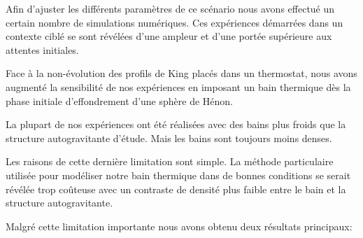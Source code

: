 Afin d'ajuster les différents paramètres de ce scénario nous avons effectué un certain nombre de simulations numériques. Ces expériences démarrées
dans un contexte ciblé se sont révélées d'une ampleur et d'une portée supérieure aux attentes initiales. 



Face à la non-évolution des profils de King placés dans un thermostat, nous avons augmenté la sensibilité de nos  expériences en imposant un bain
thermique dès la phase initiale d'effondrement d'une sphère de Hénon.



La plupart de nos expériences ont été réalisées avec des bains plus froids que la structure autogravitante d'étude. Mais les bains sont toujours moins
denses.

Les raisons de cette dernière limitation sont simple. La méthode particulaire utilisée pour modéliser notre bain
thermique dans de bonnes conditions se serait révélée trop coûteuse avec un contraste de densité plus faible entre le bain et la structure
autogravitante.


Malgré cette limitation importante nous avons obtenu deux résultats principaux:


